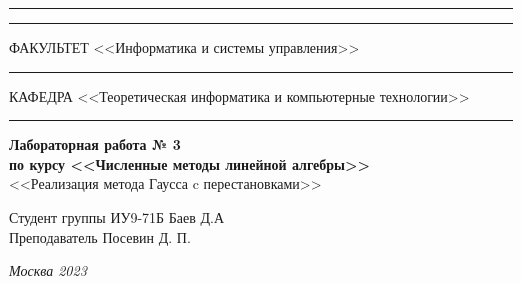 \documentclass[a4paper, 14pt]{extarticle}
\begin{document}
\begin{titlepage}
\vspace{-25pt}
\hspace{-35pt}\rule{\textwidth}{2.3pt}

\vspace*{-20.3pt}
\hspace{-35pt}\rule{\textwidth}{0.4pt}

\vspace{1.5ex}
\hspace{-35pt} \noindent \small ФАКУЛЬТЕТ\hspace{80pt} <<Информатика и системы управления>>

\vspace*{-16pt}
\hspace{47pt}\rule{0.83\textwidth}{0.4pt}

\vspace{0.5ex}
\hspace{-35pt} \noindent \small КАФЕДРА\hspace{50pt} <<Теоретическая информатика и компьютерные технологии>>

\vspace*{-16pt}
\hspace{30pt}\rule{0.866\textwidth}{0.4pt}

\vspace{11em}

\begin{center}
\Large {\bf Лабораторная работа № 3 } \\
\large {\bf по курсу <<Численные методы линейной алгебры>>} \\
\large <<Реализация метода Гаусса c перестановками>>
\end{center}\normalsize

\vspace{8em}


\begin{flushright}
  {Студент группы ИУ9-71Б Баев Д.А \hspace*{15pt}\\
  \vspace{2ex}
  Преподаватель Посевин Д. П.\hspace*{15pt}}
\end{flushright}

\bigskip

\vfill


\begin{center}
\textsl{Москва 2023}
\end{center}
\end{titlepage}
\end{document}
